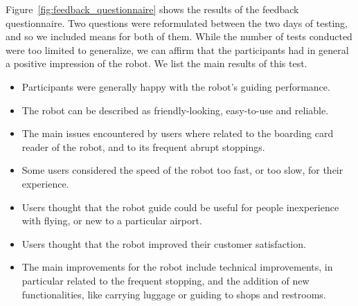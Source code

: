 Figure~\ref{fig:feedback_questionnaire} shows the results of the feedback questionnaire. Two questions were reformulated between the two days of testing, and so we included means for both of them. While the number of tests conducted were too limited to generalize, we can affirm that the participants had in general a positive impression of the robot. We list the main results of this test.

\begin{itemize}
\item Participants were generally happy with the robot's guiding performance.
\item The robot can be described as friendly-looking, easy-to-use and reliable.
\item The main issues encountered by users where related to the boarding card reader of the robot, and to its frequent abrupt stoppings.
\item Some users considered the speed of the robot too fast, or too slow, for their experience.
\item Users thought that the robot guide could be useful for people inexperience with flying, or new to a particular airport.
\item Users thought that the robot improved their customer satisfaction.
\item The main improvements for the robot include technical improvements, in particular related to the frequent stopping, and the addition of new functionalities, like carrying luggage or guiding to shops and restrooms.
\end{itemize}

